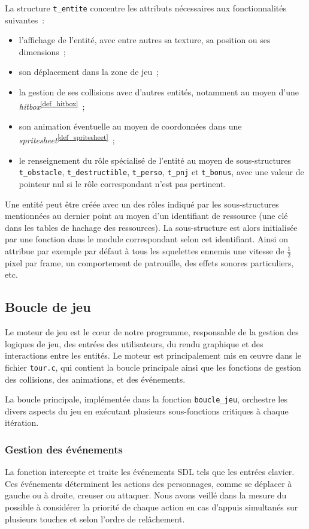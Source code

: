\documentclass[a4paper,12pt]{article}
\newcommand\refsuscrite[1]{\textsuperscript{\ref{#1}}}
\begin{document}
La structure \texttt{t\_entite} concentre les attributs nécessaires aux fonctionnalités suivantes :
\begin{itemize}
	\item l’affichage de l’entité, avec entre autres sa texture, sa position ou ses dimensions ;
	\item son déplacement dans la zone de jeu ;
	\item la gestion de ses collisions avec d’autres entités, notamment au moyen d’une \textit{hitbox}\refsuscrite{def_hitbox} ;
	\item son animation éventuelle au moyen de coordonnées dans une \textit{spritesheet}\refsuscrite{def_spritesheet} ;
	\item le renseignement du rôle spécialisé de l’entité au moyen de sous-structures \texttt{t\_obstacle}, \texttt{t\_destructible}, \texttt{t\_perso}, \texttt{t\_pnj} et \texttt{t\_bonus}, avec une valeur de pointeur nul si le rôle correspondant n’est pas pertinent.
\end{itemize}
Une entité peut être créée avec un des rôles indiqué par les sous-structures mentionnées au dernier point au moyen d’un identifiant de ressource (une clé dans les tables de hachage des ressources). La sous-structure est alors initialisée par une fonction dans le module correspondant selon cet identifiant. Ainsi on attribue par exemple par défaut à tous les squelettes ennemis une vitesse de $\frac12$ pixel par frame, un comportement de patrouille, des effets sonores particuliers, etc.

\subsection{Boucle de jeu}
Le moteur de jeu est le cœur de notre programme, responsable de la gestion des logiques de jeu, des entrées des utilisateurs, du rendu graphique et des interactions entre les entités. Le moteur est principalement mis en œuvre dans le fichier \texttt{tour.c}, qui contient la boucle principale ainsi que les fonctions de gestion des collisions, des animations, et des événements.

La boucle principale, implémentée dans la fonction \texttt{boucle\_jeu}, orchestre les divers aspects du jeu en exécutant plusieurs sous-fonctions critiques à chaque itération.

\subsubsection{Gestion des événements}
La fonction intercepte et traite les événements SDL tels que les entrées clavier. Ces événements déterminent les actions des personnages, comme se déplacer à gauche ou à droite, creuser ou attaquer. Nous avons veillé dans la mesure du possible à considérer la priorité de chaque action en cas d’appuis simultanés sur plusieurs touches et selon l’ordre de relâchement.
    
\end{document}
